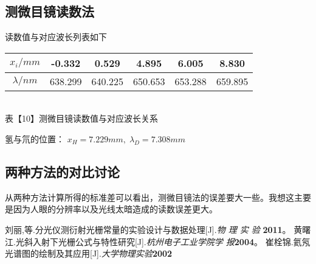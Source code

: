 \documentclass[8pt,a4paper,nocap]{ctexart}
\begin{document}
\subsection{测微目镜读数法}
读数值与对应波长列表如下
\begin{center}
	\begin{tabular}{|c|c|c|c|c|c|}\hline
		\(x_i/mm\) & -0.332 & 0.529 & 4.895 & 6.005 & 8.830 \\ \hline	
		\(\lambda/nm\) & 638.299 & 640.225 & 650.653 & 653.288 & 659.895 \\ \hline
	\end{tabular}\\
{\footnotesize		表【10】测微目镜读数值与对应波长关系}
\end{center}
氢与氘的位置： \(x_H = 7.229 mm ,\; \lambda_D = 7.308 mm\)

\subsection{两种方法的对比讨论}
从两种方法计算所得的标准差可以看出，测微目镜法的误差要大一些。我想这主要是因为人眼的分辨率以及光线太暗造成的读数误差更大。
\clearpage

\begin{thebibliography}{70}

		\bibitem{}刘丽,等.分光仪测衍射光栅常量的实验设计与数据处理[J].{\it 物 理 实 验 }{\bf2011}。
		\bibitem{}黄曙江.光斜入射下光栅公式与特性研究[J].{\it 杭州电子工业学院学 报}{\bf2004}。
		\bibitem{}崔栓锦.氦氖光谱图的绘制及其应用[J].{\it 大学物理实验}{\bf 2002}
\end{thebibliography}
\end{document}
